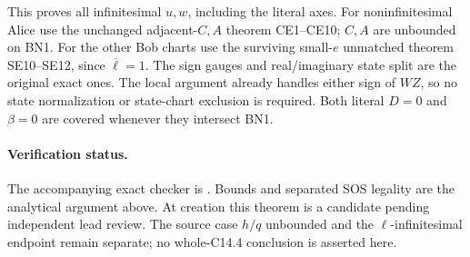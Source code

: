 This proves all infinitesimal $u,w$, including the literal axes.
For noninfinitesimal Alice use the unchanged adjacent-$C,A$ theorem
CE1--CE10; $C,A$ are unbounded on BN1. For the other Bob charts use
the surviving small-$e$ unmatched theorem SE10--SE12, since
$\overline\ell=1$. The sign gauges and real/imaginary state split
are the original exact ones. The local argument already handles
either sign of $WZ$, so no state normalization or state-chart
exclusion is required. Both literal $D=0$ and $\beta=0$ are covered
whenever they intersect BN1.

\paragraph{Verification status.}
The accompanying exact checker is
. Bounds and separated
SOS legality are the analytical argument above. At creation this
theorem is a candidate pending independent lead review. The source
case $h/q$ unbounded and the $\ell$-infinitesimal endpoint remain
separate; no whole-C14.4 conclusion is asserted here.
